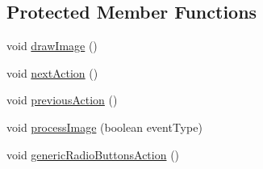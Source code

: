\subsection*{Protected Member Functions}
\begin{DoxyCompactItemize}
\item 
void \hyperlink{classgui_1_1_image_analysis_window_af3a8c3ee2b9b6c5c415df634105b5945}{draw\+Image} ()
\item 
void \hyperlink{classgui_1_1_image_analysis_window_a2fcbb99ba607aa4f115acdfa4b2bc7f7}{next\+Action} ()
\item 
void \hyperlink{classgui_1_1_image_analysis_window_ae063bb485c7ec0a4a2eaf55d38397be1}{previous\+Action} ()
\item 
void \hyperlink{classgui_1_1_image_analysis_window_a92de44ef00adbefce701ecb95b7d926b}{process\+Image} (boolean event\+Type)
\item 
void \hyperlink{classgui_1_1_image_analysis_window_ac6d8295d31ef4fe8406770e84eb35bf6}{generic\+Radio\+Buttons\+Action} ()
\end{DoxyCompactItemize}

